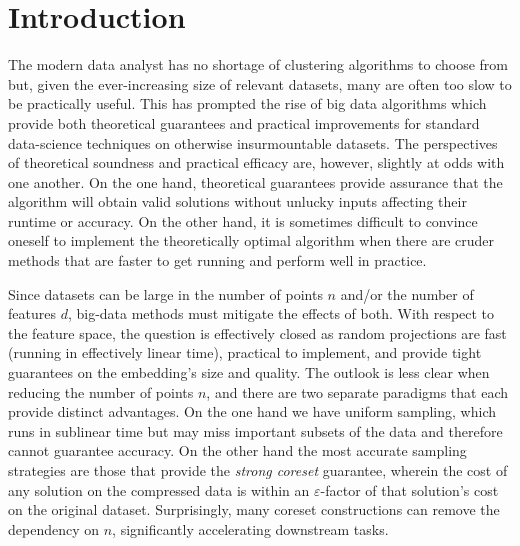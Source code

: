 \section{Introduction}

The modern data analyst has no shortage of clustering algorithms to choose from but, given the ever-increasing size of relevant datasets, many are often
too slow to be practically useful. This has prompted the rise of big data algorithms which provide both theoretical guarantees and
practical improvements for standard data-science techniques on otherwise insurmountable datasets. The perspectives
of theoretical soundness and practical efficacy are, however, slightly at odds with one another. On the one hand, theoretical guarantees provide assurance that
the algorithm will obtain valid solutions without unlucky inputs affecting their runtime or accuracy. On the other hand, it is sometimes difficult to convince
oneself to implement the theoretically optimal algorithm when there are cruder methods that are faster to get running and perform well in practice.

Since datasets can be large in the number of points $n$ and/or the number of features $d$, big-data methods must mitigate the effects of both.
With respect to the feature space, the question is effectively closed as random projections are fast (running in effectively linear time), practical to
implement, and provide tight guarantees on the embedding's size and quality. The outlook is less clear when reducing the number of points $n$, and there are
two separate paradigms that each provide distinct advantages.  On the one hand we have uniform sampling, which runs in sublinear time but may miss important subsets of
the data and therefore cannot guarantee accuracy.  On the other hand the most accurate sampling strategies are those that provide the \emph{strong coreset}
guarantee, wherein the cost of any solution on the compressed data is within an $\varepsilon$-factor of that solution's cost on the original dataset.
Surprisingly, many coreset constructions can remove the dependency on $n$, significantly accelerating downstream tasks.

